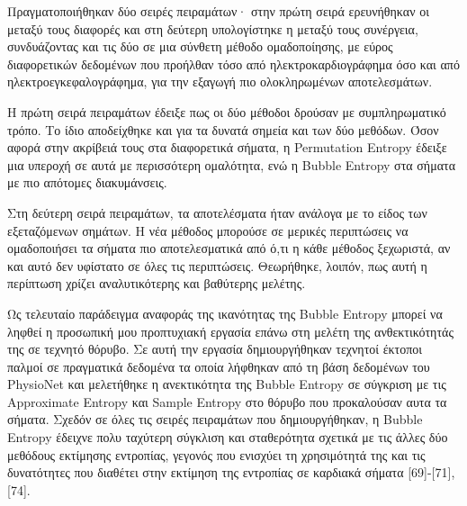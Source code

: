 Πραγματοποιήθηκαν δύο σειρές πειραμάτων· στην πρώτη σειρά ερευνήθηκαν οι μεταξύ τους διαφορές και στη δεύτερη υπολογίστηκε η μεταξύ τους συνέργεια, συνδυάζοντας και τις δύο σε μια σύνθετη μέθοδο ομαδοποίησης, με εύρος διαφορετικών δεδομένων που προήλθαν τόσο από ηλεκτροκαρδιογράφημα όσο και από ηλεκτροεγκεφαλογράφημα, για την εξαγωγή πιο ολοκληρωμένων αποτελεσμάτων. 
\par
Η πρώτη σειρά πειραμάτων έδειξε πως οι δύο μέθοδοι δρούσαν με συμπληρωματικό τρόπο. Το ίδιο αποδείχθηκε και για τα δυνατά σημεία και των δύο μεθόδων. Όσον αφορά στην ακρίβειά τους στα διαφορετικά σήματα, η \en Permutation Entropy \gr έδειξε μια υπεροχή σε αυτά με περισσότερη ομαλότητα, ενώ η \en Bubble Entropy \gr στα σήματα με πιο απότομες διακυμάνσεις. 
\par
Στη δεύτερη σειρά πειραμάτων, τα αποτελέσματα ήταν ανάλογα με
το είδος των εξεταζόμενων σημάτων. Η νέα μέθοδος μπορούσε σε μερικές περιπτώσεις να ομαδοποιήσει τα σήματα πιο αποτελεσματικά από ό,τι η κάθε μέθοδος ξεχωριστά, αν και αυτό δεν υφίστατο σε όλες τις περιπτώσεις. Θεωρήθηκε, λοιπόν, πως αυτή η περίπτωση χρίζει αναλυτικότερης και βαθύτερης μελέτης. 
\par 
Ως τελευταίο παράδειγμα αναφοράς της ικανότητας της \en Bubble Entropy \gr μπορεί να ληφθεί η προσωπική μου προπτυχιακή εργασία επάνω στη μελέτη της ανθεκτικότητάς της σε τεχνητό θόρυβο. Σε αυτή την εργασία δημιουργήθηκαν τεχνητοί έκτοποι παλμοί σε πραγματικά δεδομένα τα οποία λήφθηκαν από τη βάση δεδομένων του \en PhysioNet \gr και μελετήθηκε η ανεκτικότητα της \en Bubble Entropy \gr σε σύγκριση με τις \en Approximate Entropy \gr και \en Sample Entropy \gr στο θόρυβο που προκαλούσαν αυτα τα σήματα. Σχεδόν σε όλες τις σειρές πειραμάτων που δημιουργήθηκαν, η \en Bubble Entropy \gr έδειχνε πολυ ταχύτερη σύγκλιση και σταθερότητα σχετικά με τις άλλες δύο μεθόδους εκτίμησης εντροπίας, γεγονός που ενισχύει τη χρησιμότητά της και τις δυνατότητες που διαθέτει στην εκτίμηση της εντροπίας σε καρδιακά σήματα [69]-[71], [74]. 

